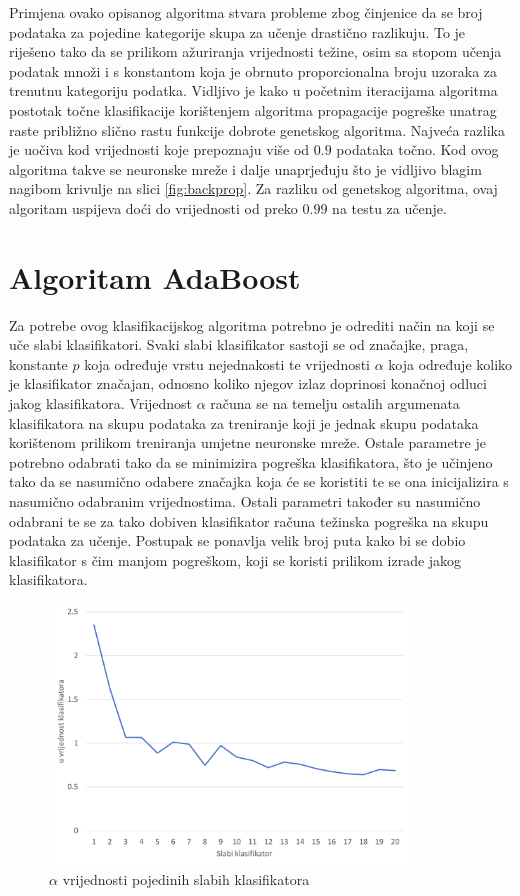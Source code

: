 \documentclass[times, utf8, zavrsni, numeric]{fer}
\begin{document}
Primjena ovako opisanog algoritma stvara probleme zbog činjenice da se broj podataka za pojedine kategorije skupa za učenje drastično razlikuju.
To je riješeno tako da se prilikom ažuriranja vrijednosti težine, osim sa stopom učenja podatak množi i s konstantom koja je obrnuto proporcionalna broju uzoraka za trenutnu kategoriju podatka.
Vidljivo je kako u početnim iteracijama algoritma postotak točne klasifikacije korištenjem algoritma propagacije pogreške unatrag raste približno slično rastu funkcije dobrote genetskog algoritma.
Najveća razlika je uočiva kod vrijednosti koje prepoznaju više od $0.9$ podataka točno.
Kod ovog algoritma takve se neuronske mreže i dalje unaprjeđuju što je vidljivo blagim nagibom krivulje na slici \ref{fig:backprop}.
Za razliku od genetskog algoritma, ovaj algoritam uspijeva doći do vrijednosti od preko $0.99$ na testu za učenje.

\section{Algoritam AdaBoost}
Za potrebe ovog klasifikacijskog algoritma potrebno je odrediti način na koji se uče slabi klasifikatori.
Svaki slabi klasifikator sastoji se od značajke, praga, konstante $p$ koja određuje vrstu nejednakosti te vrijednosti $\alpha$ koja određuje koliko je klasifikator značajan, odnosno koliko njegov izlaz doprinosi konačnoj odluci jakog klasifikatora.
Vrijednost $\alpha$ računa se na temelju ostalih argumenata klasifikatora na skupu podataka za treniranje koji je jednak skupu podataka korištenom prilikom treniranja umjetne neuronske mreže.
Ostale parametre je potrebno odabrati tako da se minimizira pogreška klasifikatora, što je učinjeno tako da se nasumično odabere značajka koja će se koristiti te se ona inicijalizira s nasumično odabranim vrijednostima.
Ostali parametri također su nasumično odabrani te se za tako dobiven klasifikator računa težinska pogreška na skupu podataka za učenje.
Postupak se ponavlja velik broj puta kako bi se dobio klasifikator s čim manjom pogreškom, koji se koristi prilikom izrade jakog klasifikatora.
\begin{figure}[ht!]
    \centering
    \includegraphics[width=0.85\textwidth]{Images/Ada.pdf}
    \captionsetup{justification=centering}
    \caption{$\alpha$ vrijednosti pojedinih slabih klasifikatora}
    \label{fig:ada}
\end{figure}
\end{document}
